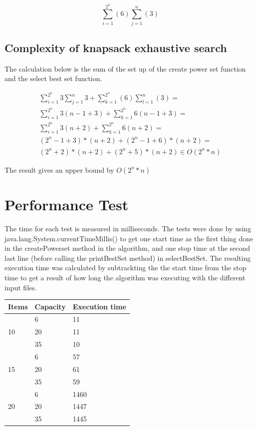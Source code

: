 \documentclass{inc/mas}
\begin{document}
\begin{equation}
\sum^{2^n}_{i=1}(6)\sum^n_{j=1}(3)
\end{equation}

\subsection{Complexity of knapsack exhaustive search}

The calculation below is the sum of the set up of the create power set function and the select best set function.

\begin{equation}
\begin{split}
\sum^{2^n}_{i =1}3\sum^n_{j=1}3+\sum^{2^n}_{k=1}(6)\sum^n_{l=1}(3)= \\
\sum^{2^n}_{i =1}3(n-1+3) + \sum^{2^n}_{k =1}6(n-1+3) =  \\
\sum^{2^n}_{i =1}3(n+2) + \sum^{2^n}_{k =1}6(n+2) = \\
(2^n-1+3)*(n+2) + (2^n-1+6)*(n+2) = \\
(2^n+2)*(n+2) + (2^n+5)*(n+2) \in O(2^n*n)
\end{split}
\end{equation}

The result gives an upper bound by $O(2^n*n)$



\section{Performance Test}

The time for each test is measured in milliseconds. The tests were done by using java.lang.System.currentTimeMillis() to get one start time as the first thing done in the createPowerset method in the algorithm, and one stop time at the second last line (before calling the printBestSet method) in selectBestSet. The resulting execution time was calculated by subtrackting the the start time from the stop time to get a result of how long the algorithm was executing with the different input files.\\

\begin{tabular}{|l|l|l|} \hline
Items &Capacity &Execution time\\ \hline
\multirow{3}{*}{10} & 6 & 11 \\
& 20 & 11 \\
& 35 & 10 \\ \hline
\multirow{3}{*}{15} & 6 & 57 \\
& 20 & 61 \\
& 35 & 59 \\ \hline
\multirow{3}{*}{20} & 6 & 1460 \\
& 20 & 1447 \\
& 35 & 1445 \\ \hline
\end{tabular}
\end{document}
